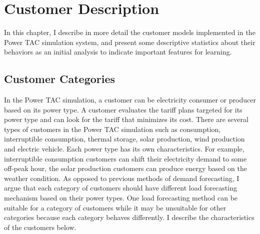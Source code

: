 
\chapter{Customer Description}  \label{customer-description}

In this chapter, I describe in more detail the customer models implemented in the Power TAC simulation system, and present some descriptive statistics about their behaviors as an initial analysis to indicate important features for learning.

\section{Customer Categories}


In the Power TAC simulation, a customer can be electricity consumer or producer based on its power type. A customer evaluates the tariff plans targeted for its power type and can look for the tariff that minimizes its cost. There are several types of customers in the Power TAC simulation such as consumption, interruptible consumption, thermal storage, solar production, wind production and electric vehicle. Each power type has its own characteristics. For example, interruptible consumption customers can shift their electricity demand to some off-peak hour, the solar production customers can produce energy based on the weather condition. As opposed to previous methods of demand forecasting, I argue that each category of customers should have different load forecasting mechanism based on their power types. One load forecasting method can be suitable for a category of customers while it may be unsuitable for other categories because each category behaves differently. I describe the characteristics of the customers below.

